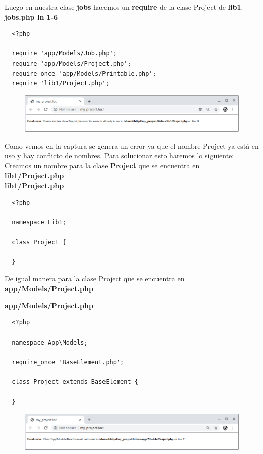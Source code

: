\documentclass{article}
\begin{document}
Luego en nuestra clase \textbf{jobs} hacemos un \textbf{require} de la clase
Project de \textbf{lib1}.\\

\textbf{jobs.php ln 1-6}
\begin{verbatim}
  <?php

  require 'app/Models/Job.php';
  require 'app/Models/Project.php';
  require_once 'app/Models/Printable.php';
  require 'lib1/Project.php';
\end{verbatim}

\begin{figure}[h!]
  \centering
  \includegraphics[scale=0.5]{./Pictures/050_namespaces.png}
\end{figure}

Como vemos en la captura se genera un error ya que el nombre Project ya está en
uso y hay conflicto de nombres. Para solucionar esto haremos lo siguiente:\\

Creamos un nombre para la clase \textbf{Project} que se encuentra en
\textbf{lib1/Project.php}\\

\textbf{lib1/Project.php}
\begin{verbatim}
  <?php

  namespace Lib1;

  class Project {

  }
\end{verbatim}

De igual manera para la clase Project que se encuentra en
\textbf{app/Models/Project.php}\\

\newpage

\textbf{app/Models/Project.php}
\begin{verbatim}
  <?php

  namespace App\Models;

  require_once 'BaseElement.php';

  class Project extends BaseElement {

  }
\end{verbatim}

\begin{figure}[h!]
  \centering
  \includegraphics[scale=0.5]{./Pictures/051_namespaces.png}
\end{figure}
\end{document}
